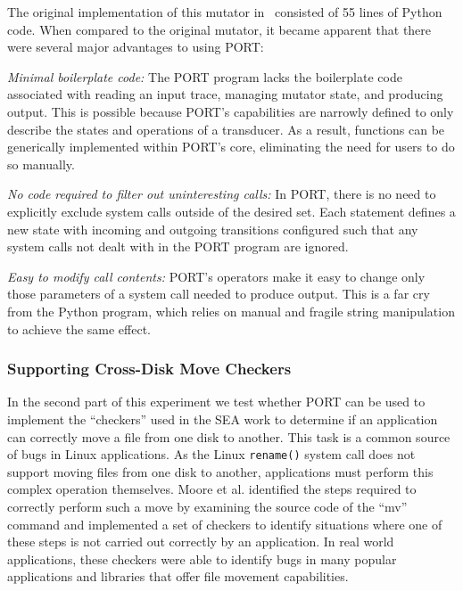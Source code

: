 The original implementation of this mutator in~\cite{DBLP:conf/issre/MooreCFW19} consisted of 55 lines
of Python code.
When compared to the original mutator, it became apparent that there were
several major advantages
to using
PORT:

\textit{Minimal boilerplate code:} The PORT program lacks the boilerplate
code associated with
reading an input trace, managing mutator state, and producing output.
This is possible because PORT's capabilities are narrowly defined to
only describe the states and operations of a transducer.  As a result,
functions can be generically implemented within PORT's core, eliminating
the need for users to do so manually.

\textit{No code required to filter out uninteresting calls:}
In PORT, there is no
need to explicitly exclude system
calls outside of the desired set.  Each statement defines a new state with
incoming and outgoing transitions configured such that any system calls not
dealt with in the PORT program are ignored.

\textit{Easy to modify call contents:}  PORT's operators make it
easy to change only those parameters  of a system call
 needed to produce output.
This is a far cry
from the Python program, which relies on manual and fragile string manipulation
to achieve the same effect.

\subsubsection{Supporting Cross-Disk Move Checkers}

In the second part of this experiment we test whether PORT can be used to
implement the ``checkers'' used in the SEA work to determine if an
application can correctly move a file from one disk to another.
This task is a common source of bugs in Linux applications. As the
Linux
{\tt rename()} system call does not support moving files from one disk to
another,
applications must perform this complex
operation themselves.
Moore et al. identified the steps required to
correctly perform such a move by examining the source code of the ``mv''
command and implemented a set of checkers to identify situations where one
of these steps is not carried out correctly by an application.
In real world applications,
these checkers were able to identify bugs
in many popular applications and libraries that offer file movement
capabilities.

